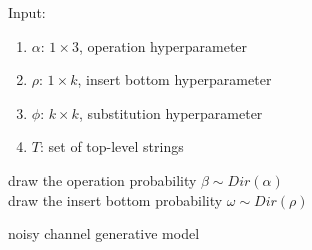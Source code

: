 \documentclass[12pt,letterpaper]{article}
\begin{document}
Input:
\begin{enumerate}
\item $\alpha$: $1\times 3$, operation hyperparameter
\item $\rho$: $1\times k$, insert bottom hyperparameter
\item $\phi$: $k\times k$, substitution hyperparameter
\item $T$: set of top-level strings
\end{enumerate}

\begin{algorithm}[H]
draw the operation probability  $\beta \sim Dir(\alpha)$ \\
draw the insert bottom probability $\omega \sim Dir(\rho)$\\

\caption{noisy channel generative model}
\end{algorithm}
\end{document}
